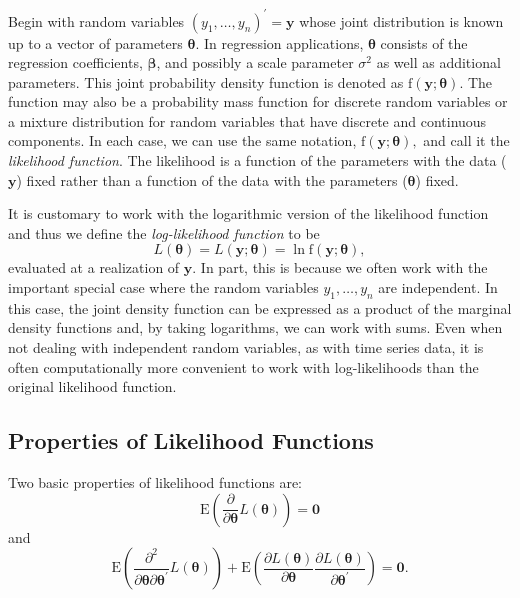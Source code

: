Begin with random variables $\left( y_1, \ldots, y_n \right)
^{\prime} = \mathbf y$ whose joint distribution is known up to a
vector of parameters $\boldsymbol \theta$. In regression
applications, $\boldsymbol \theta$ consists of the regression
coefficients, $\boldsymbol \beta$, and possibly a scale parameter
$\sigma^2$ as well as additional parameters. This joint probability
density function is denoted as $\mathrm{f}(\mathbf{y};\boldsymbol
\theta)$. The function may also be a probability mass function for
discrete random variables or a mixture distribution for random
variables that have discrete and continuous components. In each
case, we can use the same notation,
$\mathrm{f}(\mathbf{y};\boldsymbol \theta),$ and call it the
\emph{likelihood function}. The likelihood is a function of the
parameters with the data ($\mathbf{y}$) fixed rather than a function
of the data with the parameters ($\boldsymbol \theta$) fixed.

It is customary to work with the logarithmic version of the
likelihood function and thus we define the \emph{log-likelihood
function} to be
\begin{equation*}
L(\boldsymbol \theta) = L(\mathbf{y};\boldsymbol \theta ) = \ln
\mathrm{f}(\mathbf{y};\boldsymbol \theta),
\end{equation*}
evaluated at a realization of $\mathbf{y}$. In part, this is because
we often work with the important special case where the random
variables $y_1, \ldots, y_n$ are independent. In this case, the
joint density function can be expressed as a product of the marginal
density functions and, by taking logarithms, we can work with sums.
Even when not dealing with independent random variables, as with
time series data, it is often computationally more convenient to
work with log-likelihoods than the original likelihood function.

\subsection{Properties of Likelihood Functions}

Two basic properties of likelihood functions are:
\begin{equation}\label{E11:ScoreZero}
\mathrm{E} \left( \frac{ \partial}{\partial \boldsymbol \theta}
L(\boldsymbol \theta) \right) = \mathbf 0
\end{equation}
and
\begin{equation}\label{E11:HessianZero}
\mathrm{E} \left( \frac{ \partial^2}{\partial \boldsymbol \theta
\partial \boldsymbol \theta^{\prime}} L(\boldsymbol \theta) \right)
+ \mathrm{E} \left( \frac{ \partial L(\boldsymbol \theta)}{\partial
\boldsymbol \theta} \frac{ \partial L(\boldsymbol \theta)}{\partial
\boldsymbol \theta^{\prime}}
 \right) = \mathbf 0.
\end{equation}

